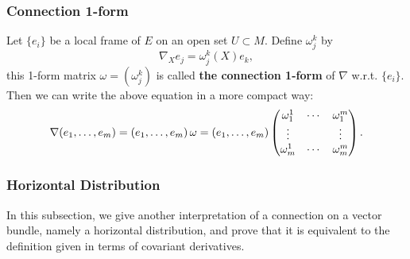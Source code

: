 \subsubsection{Connection 1-form}
Let $\{e_i\}$ be a local frame of $E$ on an open set $U\subset M$. Define $\omega_j^k$ by
\begin{equation*}
    \nabla_X e_j = \omega_j^k(X) e_k,
\end{equation*}
this 1-form matrix $\omega = (\omega_j^k)$ is called \textbf{the connection 1-form} of $\nabla$ w.r.t. $\{e_i\}$. 
Then we can write the above equation in a more compact way:
\begin{equation*}
    \nabla ({e}_{1},\dots,{e}_{m}) = ({e}_{1},\dots,{e}_{m})\,\omega = 
    ({e}_{1},\dots,{e}_{m})
    \begin{pmatrix}
        \omega_1^1 & \cdots & \omega_1^m \\
        \vdots &  & \vdots \\
        \omega_m^1 & \cdots & \omega_m^m
    \end{pmatrix}.
\end{equation*}

\subsubsection{Horizontal Distribution}
In this subsection, we give another interpretation of a connection on a vector bundle, namely a horizontal distribution, 
and prove that it is equivalent to the definition given in terms of covariant derivatives.

